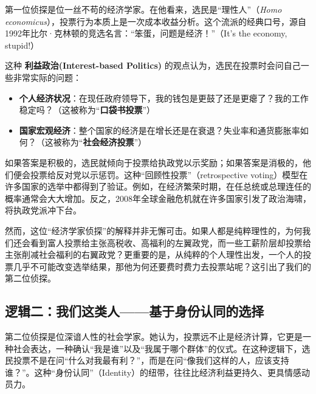 \documentclass[a5paper, 11pt, openany]{ctexbook}
\begin{document}
第一位侦探是位一丝不苟的经济学家。在他看来，选民是“理性人”（\textit{Homo economicus}），投票行为本质上是一次成本收益分析。这个流派的经典口号，源自1992年比尔·克林顿的竞选名言：“笨蛋，问题是经济！”（It's the economy, stupid!）

这种 \textbf{利益政治(Interest-based Politics)} 的观点认为，选民在投票时会问自己一些非常实际的问题：
\begin{itemize}
    \item \textbf{个人经济状况}：在现任政府领导下，我的钱包是更鼓了还是更瘪了？我的工作稳定吗？（这被称为“\textbf{口袋书投票}”）
    \item \textbf{国家宏观经济}：整个国家的经济是在增长还是在衰退？失业率和通货膨胀率如何？（这被称为“\textbf{社会经济投票}”）
\end{itemize}

如果答案是积极的，选民就倾向于投票给执政党以示奖励；如果答案是消极的，他们便会投票给反对党以示惩罚。这种“回顾性投票”（retrospective voting）模型在许多国家的选举中都得到了验证。例如，在经济繁荣时期，在任总统或总理连任的概率通常会大大增加。反之，2008年全球金融危机就在许多国家引发了政治海啸，将执政党派冲下台。

然而，这位“经济学家侦探”的解释并非无懈可击。如果人都是纯粹理性的，为何我们还会看到富人投票给主张高税收、高福利的左翼政党，而一些工薪阶层却投票给主张削减社会福利的右翼政党？更重要的是，从纯粹的个人理性出发，一个人的投票几乎不可能改变选举结果，那他为何还要费时费力去投票站呢？这引出了我们的第二位侦探。

\subsection{逻辑二：我们这类人——基于身份认同的选择}

第二位侦探是位深谙人性的社会学家。她认为，投票远不止是经济计算，它更是一种社会表达，一种确认“我是谁”以及“我属于哪个群体”的仪式。在这种逻辑下，选民投票不是在问“什么对我最有利？”，而是在问“像我们这样的人，应该支持谁？”。这种“身份认同”（Identity）的纽带，往往比经济利益更持久、更具情感动员力。
\end{document}
